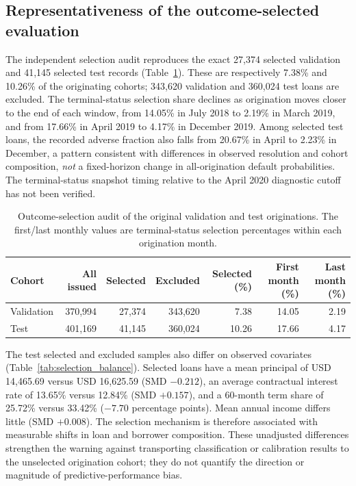 \documentclass[10pt]{article}
\begin{document}
\subsection{Representativeness of the outcome-selected evaluation}
\label{sec:selectionaudit}
The independent selection audit reproduces the exact 27,374 selected validation and 41,145 selected test records (Table~\ref{tab:selection_add}). These are respectively 7.38\% and 10.26\% of the originating cohorts; 343,620 validation and 360,024 test loans are excluded. The terminal-status selection share declines as origination moves closer to the end of each window, from 14.05\% in July 2018 to 2.19\% in March 2019, and from 17.66\% in April 2019 to 4.17\% in December 2019. Among selected test loans, the recorded adverse fraction also falls from 20.67\% in April to 2.23\% in December, a pattern consistent with differences in observed resolution and cohort composition, \emph{not} a fixed-horizon change in all-origination default probabilities. The terminal-status snapshot timing relative to the April 2020 diagnostic cutoff has not been verified.

\begin{table}[!htbp]
\centering\small
\caption{Outcome-selection audit of the original validation and test originations. The first/last monthly values are terminal-status selection percentages within each origination month.}
\label{tab:selection_add}
\begin{tabular}{lrrrrrr}
\toprule
Cohort & All issued & Selected & Excluded & Selected (\%) & First month (\%) & Last month (\%)\\
\midrule
Validation & 370,994 & 27,374 & 343,620 & 7.38 & 14.05 & 2.19\\
Test & 401,169 & 41,145 & 360,024 & 10.26 & 17.66 & 4.17\\
\bottomrule
\end{tabular}
\end{table}

The test selected and excluded samples also differ on observed covariates (Table~\ref{tab:selection_balance}). Selected loans have a mean principal of USD 14,465.69 versus USD 16,625.59 (SMD $-0.212$), an average contractual interest rate of 13.65\% versus 12.84\% (SMD $+0.157$), and a 60-month term share of 25.72\% versus 33.42\% ($-7.70$ percentage points). Mean annual income differs little (SMD $+0.008$). The selection mechanism is therefore associated with measurable shifts in loan and borrower composition. These unadjusted differences strengthen the warning against transporting classification or calibration results to the unselected origination cohort; they do not quantify the direction or magnitude of predictive-performance bias.
\end{document}

